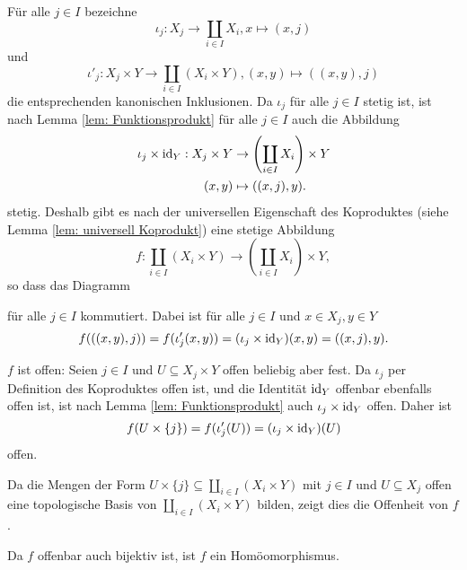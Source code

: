\documentclass[a4paper,10pt]{article}
\begin{document}
Für alle $j \in I$ bezeichne
\[
 \iota_j: X_j \to \coprod_{i \in I} X_i, x \mapsto (x,j)
\]
und
\[
 \iota'_j : X_j \times Y \to \coprod_{i \in I}(X_i \times Y), (x,y) \mapsto ((x,y),j)
\]
die entsprechenden kanonischen Inklusionen. Da $\iota_j$ für alle $j \in I$ stetig ist, ist nach Lemma \ref{lem: Funktionsprodukt} für alle $j \in I$ auch die Abbildung
\begin{align*}
 \iota_j \times \operatorname{id}_Y:
 X_j \times Y &\to \left(\coprod_{i \in I} X_i\right) \times Y \\
 (x,y) &\mapsto ((x,j),y).
\end{align*}
stetig. Deshalb gibt es nach der universellen Eigenschaft des Koproduktes (siehe Lemma \ref{lem: universell Koprodukt}) eine stetige Abbildung
\[
 f: \coprod_{i \in I} \left( X_i \times Y \right) \to \left( \coprod_{i \in I} X_i \right) \times Y,
\]
so dass das Diagramm
\begin{center}
\end{center}
für alle $j \in I$ kommutiert. Dabei ist für alle $j \in I$ und $x \in X_j, y \in Y$
\[
 f( ((x,y),j) )
 = f( \iota_j'(x,y) )
 = (\iota_j \times \operatorname{id}_Y)(x,y)
 = ((x,j),y).
\]

$f$ ist offen: Seien $j \in I$ und $U \subseteq X_j \times Y$ offen beliebig aber fest. Da $\iota_j$ per Definition des Koproduktes offen ist, und die Identität $\operatorname{id}_Y$ offenbar ebenfalls offen ist, ist nach Lemma \ref{lem: Funktionsprodukt} auch $\iota_j \times \operatorname{id}_Y$ offen. Daher ist
\[
 f(U \times \{j\})
 = f(\iota_j'(U))
 = (\iota_j \times \operatorname{id}_Y)(U)
\]
offen.

Da die Mengen der Form $U \times \{j\} \subseteq \coprod_{i \in I} (X_i \times Y)$ mit $j \in I$ und $U \subseteq X_j$ offen eine topologische Basis von $\coprod_{i \in I}(X_i \times Y)$ bilden, zeigt dies die Offenheit von $f$.

Da $f$ offenbar auch bijektiv ist, ist $f$ ein Homöomorphismus.
\end{document}
